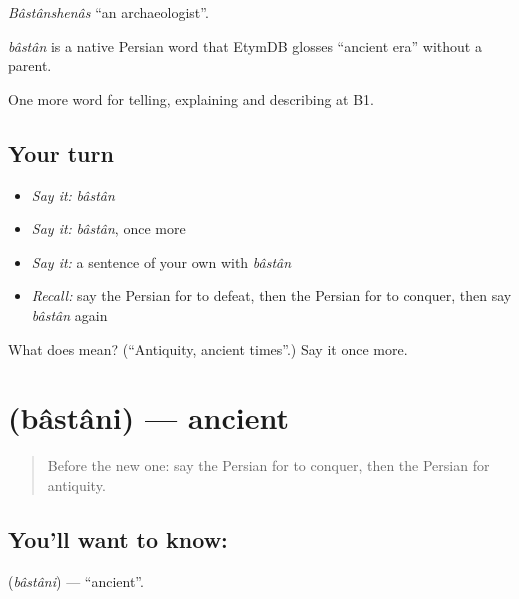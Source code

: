 \emph{Bâstânshenâs} \textquotedblleft{}an archaeologist\textquotedblright{}.

\begin{cousinweb}
\emph{bâstân} is a native Persian word that EtymDB glosses \textquotedblleft{}ancient era\textquotedblright{} without a parent.
\end{cousinweb}

\begin{grammarlens}[title={What you've built}]
One more word for telling, explaining and describing at B1.
\end{grammarlens}

\subsection*{Your turn}
\begin{itemize}
\raggedright
  \item \emph{Say it:} \emph{bâstân}
  \item \emph{Say it:} \emph{bâstân}, once more
  \item \emph{Say it:} a sentence of your own with \emph{bâstân}
  \item \emph{Recall:} say the Persian for to defeat, then the Persian for to conquer, then say \emph{bâstân} again
\end{itemize}

\begin{tcolorbox}[breakable,colback=teal!4,colframe=teal!35!black,title={Before you move on}]
What does  mean? (\textquotedblleft{}Antiquity, ancient times\textquotedblright{}.) Say it once more.
\end{tcolorbox}
\section[\texorpdfstring{\fa{باستانی} (bâstâni)}{باستانی (bâstâni)}]{ (bâstâni) — ancient}

\label{lesson:FA-C352-bastani}



\begin{quote}
Before the new one: say the Persian for to conquer, then the Persian for antiquity.
\end{quote}

\subsection*{You'll want to know: }
\textbf{} (\emph{bâstâni}) — \textquotedblleft{}ancient\textquotedblright{}.

